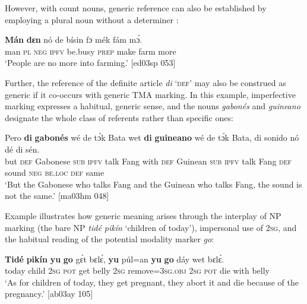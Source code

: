 However, with count nouns, generic reference can also be established by employing a plural noun without a determiner :


\ea%
    \label{ex:key:227}
    \gll \textbf{Mán}  \textbf{dɛn}  nó  de  bísin  fɔ  mék    fám    mɔ́.\\
man    \textsc{pl}  \textsc{neg}  \textsc{ipfv}  be.busy  \textsc{prep}  make  farm  more\\

\glt ‘People are no more into farming.’ [ed03sp 053]
\z

Further, the reference of the definite article \textit{di} ‘\textsc{def’} may also be construed as generic if it co-occurs with generic TMA marking. In this example, imperfective marking expresses a habitual, generic sense, and the nouns \textit{gabonés} and \textit{guineano} designate the whole class of referents rather than specific ones: 


\ea%
    \label{ex:key:228}
    \gll Pero    \textbf{di}  \textbf{gabonés}    wé  de  tɔ́k  Bata    wet    \textbf{di}  \textbf{guineano} 
wé  de  tɔ́k   Bata,  di  sonido  nó  dé    di  sén.\\
but    \textsc{def}  Gabonese  \textsc{sub}  \textsc{ipfv}  talk  Fang  with    \textsc{def}  Guinean    
\textsc{sub}  \textsc{ipfv}  talk Fang    \textsc{def}  sound  \textsc{neg}  \textsc{be.loc}  \textsc{def}  same\\

\glt ‘But the Gabonese who talks Fang and the Guinean who talks Fang, the sound is not the same.’ [ma03hm 048]
\z

Example  illustrates how generic meaning arises through the interplay of NP marking (the bare NP \textit{tidé pikín} ‘children of today’), impersonal use of \textsc{2sg}, and the habitual reading of the potential modality marker \textit{go}: 


\ea%
    \label{ex:key:229}
    \gll \textbf{Tidé}  \textbf{pikín}  \textbf{yu}  \textbf{go}  gɛ́t  bɛlɛ́,    \textbf{yu}  púl=an
\textbf{yu}  \textbf{go}  dáy  wet    bɛlɛ́.\\
today  child  \textsc{2sg}  \textsc{pot}  get  belly  \textsc{2sg}  remove=\textsc{3sg.obj}
\textsc{2sg}  \textsc{pot}  die  with    belly\\

\glt ‘As for children of today, they get pregnant, they abort it and die because of the pregnancy.’ [ab03ay 105]
\z

